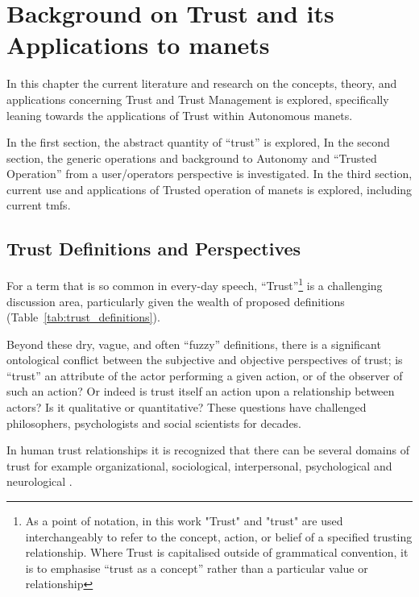 \def\ChapterTitle{Background on Trust and its Applications to \gls{manet}s} %
\ifx\ifthesis\undefined

\else
\chapter{\ChapterTitle}
\label{Chapter\thechapter}
\fi
In this chapter the current literature and research on the concepts, theory, and applications concerning Trust and Trust Management is explored, specifically leaning towards the applications of Trust within Autonomous \glspl{manet}.

In the first section, the abstract quantity of ``trust'' is explored,
In the second section, the generic operations and background to Autonomy and ``Trusted Operation'' from a user/operators perspective is investigated. 
In the third section, current use and applications of Trusted operation of \glspl{manet} is explored, including current \glspl{tmf}.


\section{Trust Definitions and Perspectives}


For a term that is so common in every-day speech, ``Trust''\footnote{As a point of notation, in this work "Trust" and "trust" are used interchangeably to refer to the concept, action, or belief of a specified trusting relationship. Where Trust is capitalised outside of grammatical convention, it is to emphasise ``trust as a concept'' rather than a particular value or relationship} is a challenging discussion area, particularly given the wealth of proposed definitions (Table~\ref{tab:trust_definitions}).

Beyond these dry, vague, and often ``fuzzy'' definitions, there is a significant ontological conflict between the subjective and objective perspectives of trust; is ``trust'' an attribute of the actor performing a given action, or of the observer of such an action? Or indeed is trust itself an action upon a relationship between actors? Is it qualitative or quantitative? These questions have challenged philosophers, psychologists and social scientists for decades.

In human trust relationships it is recognized that there can be several domains of trust for example organizational, sociological, interpersonal, psychological and neurological \cite{Lee2004}.

